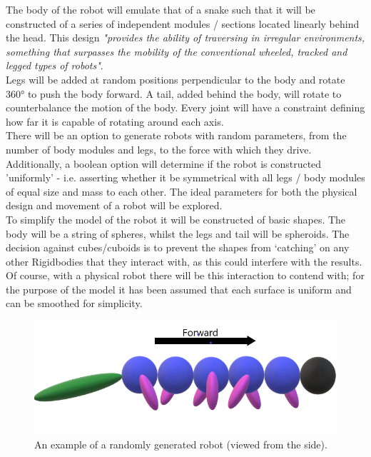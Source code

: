 \documentclass{article}
\begin{document}
The body of the robot will emulate that of a snake such that it will be constructed of a series of independent modules / sections located linearly behind the head. This design \textit{"provides the ability of traversing in irregular environments, something that surpasses the mobility of the conventional wheeled, tracked and legged types of robots"}. \\
Legs will be added at random positions perpendicular to the body and rotate 360° to push the body forward. A tail, added behind the body, will rotate to counterbalance the motion of the body. Every joint will have a constraint defining how far it is capable of rotating around each axis. \\

There will be an option to generate robots with random parameters, from the number of body modules and legs, to the force with which they drive. Additionally, a boolean option will determine if the robot is constructed 'uniformly' - i.e. asserting whether it be symmetrical with all legs / body modules of equal size and mass to each other. The ideal parameters for both the physical design and movement of a robot will be explored.\\

To simplify the model of the robot it will be constructed of basic shapes. The body will be a string of spheres, whilst the legs and tail will be spheroids. The decision against cubes/cuboids is to prevent the shapes from ‘catching’ on any other Rigidbodies that they interact with, as this could interfere with the results. Of course, with a physical robot there will be this interaction to contend with; for the purpose of the model it has been assumed that each surface is uniform and can be smoothed for simplicity. \\

\begin{figure}[H]
\centering
\includegraphics[scale=0.5]{robotDesign}
\caption{An example of a randomly generated robot (viewed from the side).}
\end{figure}
\end{document}
